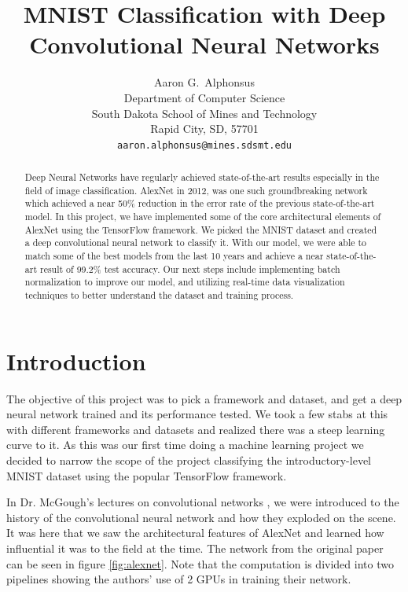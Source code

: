 \documentclass{article}
\title{MNIST Classification with Deep Convolutional Neural Networks}
\author{
  Aaron G.~Alphonsus \\
  Department of Computer Science \\
  South Dakota School of Mines and Technology \\
  Rapid City, SD, 57701 \\
  \texttt{aaron.alphonsus@mines.sdsmt.edu} \\
}
\begin{document}

\maketitle


\begin{abstract}
	Deep Neural Networks have regularly achieved state-of-the-art results especially in the field of image classification. AlexNet in 2012, was one such groundbreaking network which achieved a near 50\% reduction in the error rate of the previous state-of-the-art model. In this project, we have implemented some of the core architectural elements of AlexNet using the TensorFlow framework. We picked the MNIST dataset and created a deep convolutional neural network to classify it. With our model, we were able to match some of the best models from the last 10 years and achieve a near state-of-the-art result of 99.2\% test accuracy. Our next steps include implementing batch normalization to improve our model, and utilizing real-time data visualization techniques to better understand the dataset and training process. 
\end{abstract}


\section{Introduction}

The objective of this project was to pick a framework and dataset, and get 
a deep neural network trained and its performance tested. We took a few stabs at 
this with different frameworks and datasets and realized there was a steep 
learning curve to it. As this was our first time doing a machine learning 
project we decided to narrow the scope of the project classifying the 
introductory-level MNIST \cite{mnist} dataset using the popular TensorFlow framework.  

In Dr. McGough's lectures on convolutional networks \cite{convnets}, we were introduced to the history of the convolutional neural network and how they exploded on the scene. It was here that we saw the architectural features of AlexNet and learned how influential it was to the field at the time. The network from the original paper can be seen in figure \ref{fig:alexnet}. Note that the computation is divided into two pipelines showing the authors' use of 2 GPUs in training their network.
\end{document}

